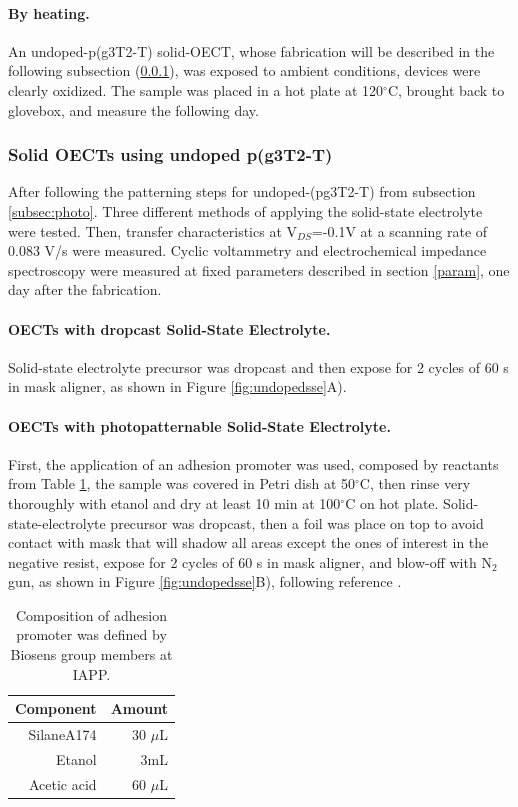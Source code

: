 \paragraph{By heating.}An undoped-p(g3T2-T) solid-OECT, whose fabrication will be described in the following subsection (\ref{subsec:solidOECT}), was exposed to ambient conditions, devices were clearly oxidized. The sample was placed in a hot plate at 120$^{\circ}$C, brought back to glovebox, and measure the following day.  %
\subsubsection{Solid OECTs using undoped p(g3T2-T)} \label{subsec:solidOECT}
After following the patterning steps for undoped-(pg3T2-T) from subsection \ref{subsec:photo}. Three different methods of applying the solid-state electrolyte were tested. Then, transfer characteristics at V$_{DS}$=-0.1V at a scanning rate of 0.083 V/s were measured. Cyclic voltammetry and electrochemical impedance spectroscopy were measured at fixed parameters described in section \ref{param}, one day after the fabrication.

\paragraph{OECTs with dropcast Solid-State Electrolyte.}Solid-state electrolyte precursor was dropcast and then expose for 2 cycles of 60 s in mask aligner, as shown in Figure \ref{fig:undopedsse}A). 

\paragraph{OECTs with photopatternable Solid-State Electrolyte.}First, the application of an adhesion promoter was used, composed by reactants from Table \ref{tab:adprom}, the sample was covered in Petri dish at 50$^{\circ}$C, then rinse very thoroughly with etanol and dry at least 10 min at 100$^{\circ}$C on hot plate. Solid-state-electrolyte precursor was dropcast, then a foil was place on top to avoid contact with mask that will shadow all areas except the ones of interest in the negative resist, expose for 2 cycles of 60 s in mask aligner, and blow-off with N$_{2}$ gun, as shown in Figure \ref{fig:undopedsse}B),  following reference \cite{weissbachPhotopatternableSolidElectrolyte2022}.

\begin{table}[h]
	\centering
	\caption{Composition of adhesion promoter was defined by Biosens group members at IAPP.}
	\begin{tabular}{r r} \hline
		Component   & Amount \\ \hline
		SilaneA174	& 30 $\mu$L \\ 
		Etanol   & 3mL \\ 
		Acetic acid   & 60 $\mu$L \\ \hline
	\end{tabular}
	\label{tab:adprom}
\end{table}

